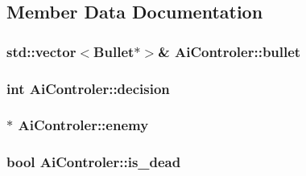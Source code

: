 \subsection{Member Data Documentation}
\hypertarget{class_ai_controler_a11a907d64a91c99ca5df9a908c1fdad7}{}
\subsubsection[{bullet}]{\setlength{\rightskip}{0pt plus 5cm}std\+::vector$<${\bf Bullet}$\ast$$>$\& Ai\+Controler\+::bullet\hspace{0.3cm}{\ttfamily [private]}}\label{class_ai_controler_a11a907d64a91c99ca5df9a908c1fdad7}
\hypertarget{class_ai_controler_a8d44859dfa97e10f04c532a0f2d69bfb}{}
\subsubsection[{decision}]{\setlength{\rightskip}{0pt plus 5cm}int Ai\+Controler\+::decision\hspace{0.3cm}{\ttfamily [private]}}\label{class_ai_controler_a8d44859dfa97e10f04c532a0f2d69bfb}
\hypertarget{class_ai_controler_a71e4c6c84203c1b50b6e1d55b582db62}{}
\subsubsection[{enemy}]{$\ast$ Ai\+Controler\+::enemy\hspace{0.3cm}{\ttfamily [private]}}\label{class_ai_controler_a71e4c6c84203c1b50b6e1d55b582db62}
\hypertarget{class_ai_controler_aaf7042b1051e301b6b356bc6d702dccd}{}
\subsubsection[{is\+\_\+dead}]{\setlength{\rightskip}{0pt plus 5cm}bool Ai\+Controler\+::is\+\_\+dead\hspace{0.3cm}{\ttfamily [private]}}\label{class_ai_controler_aaf7042b1051e301b6b356bc6d702dccd}
\hypertarget{class_ai_controler_ab541f013a1b6ba763ec1bc4c183816d0}{}
